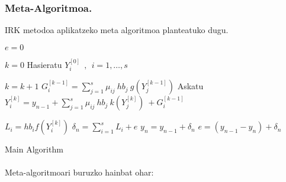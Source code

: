 \subsubsection*{Meta-Algoritmoa.}
IRK metodoa aplikatzeko meta algoritmoa planteatuko dugu.

\begin{algorithm}[H]
 \BlankLine
  $e=0$\;
  {
   \BlankLine
   $k=0 $\;
   Hasieratu  $Y_{i}^{[0]} \ \ , \ \ i=1,\dots,s $\;   
   \BlankLine
   {
    \BlankLine 
    $k=k+1$\;
    {$G_{i}^{[k-1]}=\sum\limits_{j=1}^{s} \mu_{ij} \ hb_j \ g(Y_{j}^{[k-1]}) $\;
    }  
    Askatu $Y_i^{[k]}=y_{n-1}+ \sum\limits_{j=1}^{s} \mu_{ij} \ hb_j \ k(Y_{j}^{[k]}) \ +G_{i}^{[k-1]} $\;

   }
   \BlankLine
    $L_i= hb_i f(Y_i^{[k]})$\;
    $\delta_{n}= \sum\limits_{i=1}^{s} L_{i}+e $\;
    $y_{n}=y_{n-1}+ \delta_{n} $\;
    $e=(y_{n-1}-y_n)+\delta_n$\;
   \BlankLine
 }
 \caption{Main Algorithm}
\end{algorithm}

\paragraph*{} Meta-algoritmoari buruzko hainbat ohar:


